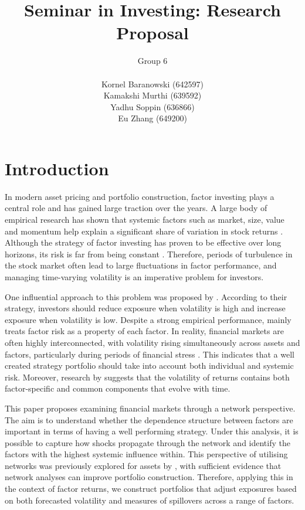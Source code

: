 \documentclass[11pt]{article}
\begin{document}
 
 
\title{Seminar in Investing: Research Proposal }
\author{Group 6 \\ \\Kornel Baranowski (642597)\\ Kamakshi Murthi (639592)\\ Yadhu Soppin (636866)\\ Eu Zhang (649200)}

\maketitle
\newpage
\section{Introduction}
\label{sec:introduction}
In modern asset pricing and portfolio construction, factor investing plays a central role and has gained large traction over the years. A large body of empirical research has shown that systemic factors such as market, size, value and momentum help explain a significant share of variation in stock returns \citep{fama2015five, jegadeesh1993returns}. Although the strategy of factor investing has proven to be effective over long horizons, its risk is far from being constant \citep{moreira2017volatility}. Therefore, periods of turbulence in the stock market often lead to large fluctuations in factor performance, and managing time-varying volatility is an imperative problem for investors. 

One influential approach to this problem was proposed by \cite{moreira2017volatility}. According to their strategy, investors should reduce exposure when volatility is high and increase exposure when volatility is low. Despite a strong empirical performance, \cite{moreira2017volatility} mainly treats factor risk as a property of each factor. In reality, financial markets are often highly interconnected, with volatility rising simultaneously across assets and factors, particularly during periods of financial stress \citep{DieboldYilmaz2009}. This indicates that a well created strategy portfolio should take into account both individual and systemic risk. Moreover, research by \cite{ConnorKorajczykLinton2006} suggests that the volatility of returns contains both factor-specific and common components that evolve with time. 

This paper proposes examining financial markets through a network perspective. The aim is to understand whether the dependence structure between factors are important in terms of having a well performing strategy. Under this analysis, it is possible to capture how shocks propagate through the network and identify the factors with the highest systemic influence within. This perspective of utilising networks was previously explored for assets by \cite{peralta2016network}, with sufficient evidence that network analyses can improve portfolio construction. Therefore, applying this in the context of factor returns, we construct portfolios that adjust exposures based on both forecasted volatility and measures of spillovers across a range of factors. 
\end{document}

